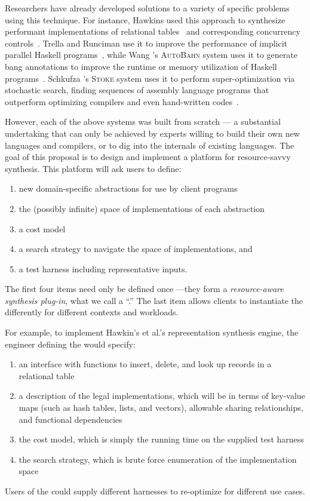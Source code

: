 Researchers have already developed solutions to a variety of specific problems
using this technique.  
For instance, Hawkins \etal{} used this approach to synthesize
performant implementations of relational tables~\cite{data-rep-synth} 
and corresponding concurrency controls~\cite{conc-data-rep-synth}.
Trella and Runciman use it to improve the performance of implicit parallel
Haskell programs~\cite{implicit-parallel}, while
Wang \etal{}'s \textsc{AutoBahn} system uses it to generate bang
annotations to improve the runtime or memory utilization of Haskell
programs~\cite{autobahn}.  Schkufza \etal{}'s \textsc{Stoke} system
uses it to perform super-optimization via stochastic search, finding
sequences of assembly language programs that outperform optimizing
compilers and even hand-written codes~\cite{stochastic-superopt}.

However, each of the above systems was built from scratch --- a substantial undertaking
that can only be achieved by experts willing to build their own new languages and
compilers, or to dig into the internals of existing languages.  The goal of
this proposal is to design and implement a platform for resource-savvy
synthesis.  This platform will ask users to define:

\begin{enumerate}
\item new domain-specific abstractions for use by client programs
\item the (possibly infinite) space of implementations of each abstraction
\item a cost model
\item a search strategy to navigate the space of implementations, and 
\item a test harness including representative inputs.
\end{enumerate}
%
The first four items need only be defined once ---they form a
\emph{resource-aware synthesis plug-in}, what we call a ``\rasp{}.''
The last item allows clients to instantiate the \rasp{} differently for
different contexts and workloads.

For example, to implement Hawkin's et al.'s representation synthesis engine, the
engineer defining the \rasp{} would specify:

\begin{enumerate}
\item an interface with functions to insert, delete, and look up records in a relational table
\item a description of the legal implementations, which will be in terms of key-value maps
(such as hash tables, lists, and vectors), allowable sharing
relationships, and functional dependencies
\item the cost model, which is simply the running time on the supplied test harness
\item the search strategy, which is brute force enumeration of the implementation space
\end{enumerate}
%
Users of the \rasp{} could supply different harnesses to re-optimize for
different use cases.

